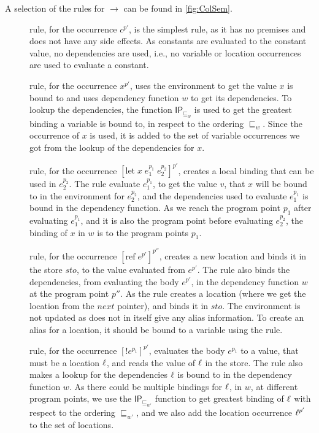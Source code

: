 \documentclass[acmsmall,sigplan]{acmart}
\newcommand{\uf}{\ensuremath{\mathsf{IP}}}
\begin{document}
A selection of the rules for $\rightarrow$ can be found in \cref{fig:ColSem}.

\begin{description}
	\item[] rule, for the occurrence $c^{p'}$, is the simplest rule, as it has no premises and does not have any side effects.
		As constants are evaluated to the constant value, no dependencies are used, i.e., no variable or location occurrences are used to evaluate a constant.

	\item[] rule, for the occurrence $x^{p'}$, uses the environment to get the value $x$ is bound to and uses dependency function $w$ to get its dependencies.
		To lookup the dependencies, the function $\uf_{\sqsubseteq_w}$ is used to get the greatest binding a variable is bound to, in respect to the ordering $\sqsubseteq_w$.
		Since the occurrence of $x$ is used, it is added to the set of variable occurrences we got from the lookup of the dependencies for $x$.

	\item[] rule, for the occurrence $[\mbox{let}\;x\;e_1^{p_1}\;e_2^{p_2}]^{p'}$, creates a local binding that can be used in $e_2^{p_2}$.
		The  rule evaluate $e_1^{p_1}$, to get the value $v$, that $x$ will be bound to in the environment for $e_2^{p_2}$, and the dependencies used to evaluate $e_1^{p_1}$ is bound in the dependency function.
		As we reach the program point $p_1$ after evaluating $e_1^{p_1}$, and it is also the program point before evaluating $e_2^{p_2}$, the binding of $x$ in $w$ is to the program points $p_1$.	

	\item[] rule, for the occurrence $[\mbox{ref}\;e^{p'}]^{p''}$, creates a new location and binds it in the store $sto$, to the value evaluated from $e^{p'}$.
		The  rule also binds the dependencies, from evaluating the body $e^{p'}$, in the dependency function $w$ at the program point $p''$.
		As the  rule creates a location (where we get the location from the $next$ pointer), and binds it in $sto$.
		The environment is not updated as  does not in itself give any alias information.
		To create an alias for a location, it should be bound to a variable using the  rule.

	\item[] rule, for the occurrence $[!e^{p_1}]^{p'}$, evaluates the body $e^{p_1}$ to a value, that must be a location $\ell$, and reads the value of $\ell$ in the store.
		The  rule also makes a lookup for the dependencies $\ell$ is bound to in the dependency function $w$.
		As there could be multiple bindings for $\ell$, in $w$, at different program points, we use the $\uf_{\sqsubseteq_{w'}}$ function to get greatest binding of $\ell$ with respect to the ordering $\sqsubseteq_{w'}$, 
		and we also add the location occurrence $\ell^{p'}$ to the set of locations.


\end{description}
\end{document}
